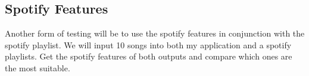\subsection{Spotify Features}
Another form of testing will be to use the spotify features in conjunction with the spotify playlist. We will input 10 songs into both my application and a spotify playlists. Get the spotify features of both outputs and compare which ones are the most suitable.
 


